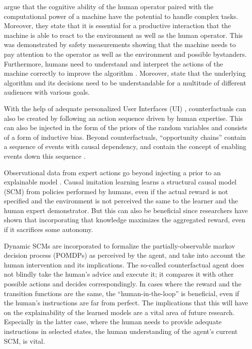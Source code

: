 \documentclass[twoside,11pt]{article}
\begin{document}
\citet{LiangEtAl:2017:HITLReinforcementLearn} argue that the cognitive ability of the human operator paired with the computational power of a machine have the potential to handle complex tasks. Moreover, they state that it is essential for a productive interaction that the machine is able to react to the environment as well as the human operator. This was demonstrated by safety measurements showing that the machine needs to pay attention to the operator as well as the environment and possible bystanders. Furthermore, humans need to understand and interpret the actions of the machine correctly to improve the algorithm \citep{heuillet2021explainability}. Moreover, \citet{heuillet2021explainability} state that the underlying algorithm and its decisions need to be understandable for a multitude of different audiences with various goals.


With the help of adequate personalized User Interfaces (UI) \citep{Sun:2021:TopologyPerturbationGNNs}, counterfactuals can also be created by following an action sequence driven by human expertise. This can also be injected in the form of the priors of the random variables and consists of a form of inductive bias.
Beyond counterfactuals, ``opportunity chains'' contain a sequence of events with causal dependency, and contain the concept of enabling events down this sequence \citep{Madumal:2020:DistalEF}.

Observational data from expert actions go beyond injecting a prior to an explainable model \citep{Zhang:2020:CausalImitationLearning}. Causal imitation learning learns a structural causal model (SCM) \citep{Pearl:2000:ModelsReasoningInference} from policies performed by humans, even if the actual reward is not specified and the environment is not perceived the same to the learner and the human expert demonstrator. But this can also be beneficial since researchers have shown that incorporating that knowledge maximizes the aggregated reward, even if it sacrifices some autonomy. 

Dynamic SCMs are incorporated to formalize the partially-observable markov decision process (POMDPs) \citep{SuttonBarto:2018:RLIntroduction} as perceived by the agent, and take into account the human intervention and its implications. The so-called counterfactual agent does not blindly take the human's advice and execute it; it compares it with other possible actions and decides correspondingly. In cases where the reward and the transition functions are the same, the ``human-in-the-loop'' is beneficial, even if the human's instructions are far from perfect. The implications that this will have on the explainability of the learned models are a vital area of future research. Especially in the latter case, where the human needs to provide adequate instructions in selected states, the human understanding of the agent's current SCM, is vital.  
\end{document}
